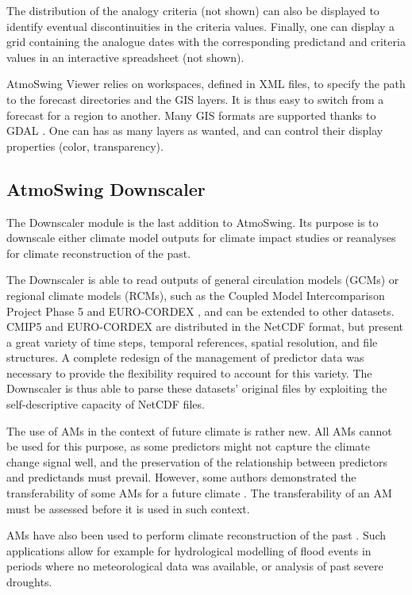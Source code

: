 \documentclass[review]{elsarticle}
\begin{document}
The distribution of the analogy criteria (not shown) can also be displayed to identify eventual discontinuities in the criteria values. Finally, one can display a grid containing the analogue dates with the corresponding predictand and criteria values in an interactive spreadsheet (not shown).

AtmoSwing Viewer relies on workspaces, defined in XML files, to specify the path to the forecast directories and the GIS layers. It is thus easy to switch from a forecast for a region to another. Many GIS formats are supported thanks to GDAL \cite[Geospatial Data Abstraction Library,][]{GDAL2014}. One can has as many layers as wanted, and can control their display properties (color, transparency).


\subsection{AtmoSwing Downscaler}
\label{sec:downscaler}

The Downscaler module is the last addition to AtmoSwing. Its purpose is to downscale either climate model outputs for climate impact studies or reanalyses for climate reconstruction of the past. 

The Downscaler is able to read outputs of general circulation models (GCMs) or regional climate models (RCMs), such as the Coupled Model Intercomparison Project Phase 5 \citep[CMIP5,][]{Taylor2012} and EURO-CORDEX \citep{Jacob2014}, and can be extended to other datasets. CMIP5 and EURO-CORDEX are distributed in the NetCDF format, but present a great variety of time steps, temporal references, spatial resolution, and file structures. A complete redesign of the management of predictor data was necessary to provide the flexibility required to account for this variety. The Downscaler is thus able to parse these datasets' original files by exploiting the self-descriptive capacity of NetCDF files.

The use of AMs in the context of future climate is rather new. All AMs cannot be used for this purpose, as some predictors might not capture the climate change signal well, and the preservation of the relationship between predictors and predictands must prevail. However, some authors demonstrated the transferability of some AMs for a future climate \citep{Dayon2015, Dayon2018, Raynaud2016, Turco2017}. The transferability of an AM must be assessed before it is used in such context. 

AMs have also been used to perform climate reconstruction of the past \citep{Caillouet2016, Caillouet2017, Bonnet2017}. Such applications allow for example for hydrological modelling of flood events in periods where no meteorological data was available, or analysis of past severe droughts.
\end{document}
